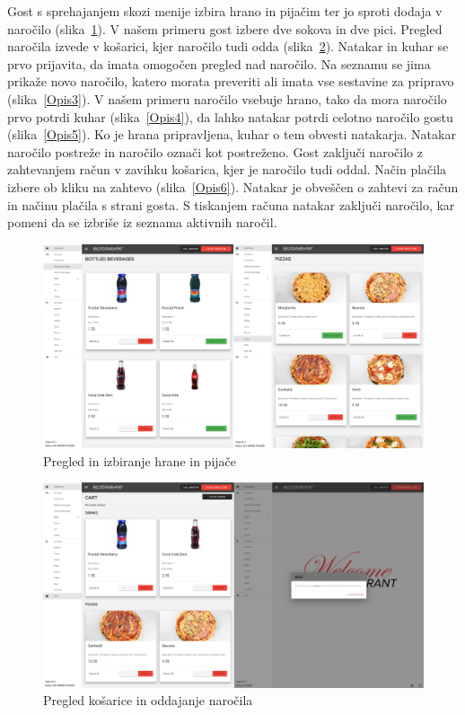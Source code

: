 \documentclass[a4paper, 12pt]{book}
\begin{document}
Gost s sprehajanjem skozi menije izbira hrano in pijačim ter jo sproti dodaja v naročilo (slika~\ref{Opis1}). V našem primeru gost izbere dve sokova in dve pici. Pregled naročila izvede v košarici, kjer naročilo tudi odda (slika~\ref{Opis2}).
Natakar in kuhar se prvo prijavita, da imata omogočen pregled nad naročilo. Na seznamu se jima prikaže novo naročilo, katero morata preveriti ali imata vse sestavine za pripravo (slika~\ref{Opis3}). V našem primeru naročilo vsebuje hrano, tako da mora naročilo prvo potrdi kuhar (slika~\ref{Opis4}), da lahko natakar potrdi celotno naročilo gostu (slika~\ref{Opis5}). Ko je hrana pripravljena, kuhar o tem obvesti natakarja. Natakar naročilo postreže in naročilo označi kot postreženo. Gost zaključi naročilo z zahtevanjem račun v zavihku košarica, kjer je naročilo tudi oddal. Način plačila izbere ob kliku na zahtevo (slika~\ref{Opis6}). Natakar je obveščen o zahtevi za račun in načinu plačila s strani gosta. S tiskanjem računa natakar zaključi naročilo, kar pomeni da se izbriše iz seznama aktivnih naročil.

\begin{figure}[!htb]
\begin{center}
\includegraphics[width=14.5cm]{opis1.jpg}
\caption{Pregled in izbiranje hrane in pijače}
\label{Opis1}
\end{center}
\end{figure}

\begin{figure}[!htb]
\begin{center}
\includegraphics[width=14.5cm]{opis11.jpg}
\caption{Pregled košarice in oddajanje naročila}
\label{Opis2}
\end{center}
\end{figure}
\end{document}
